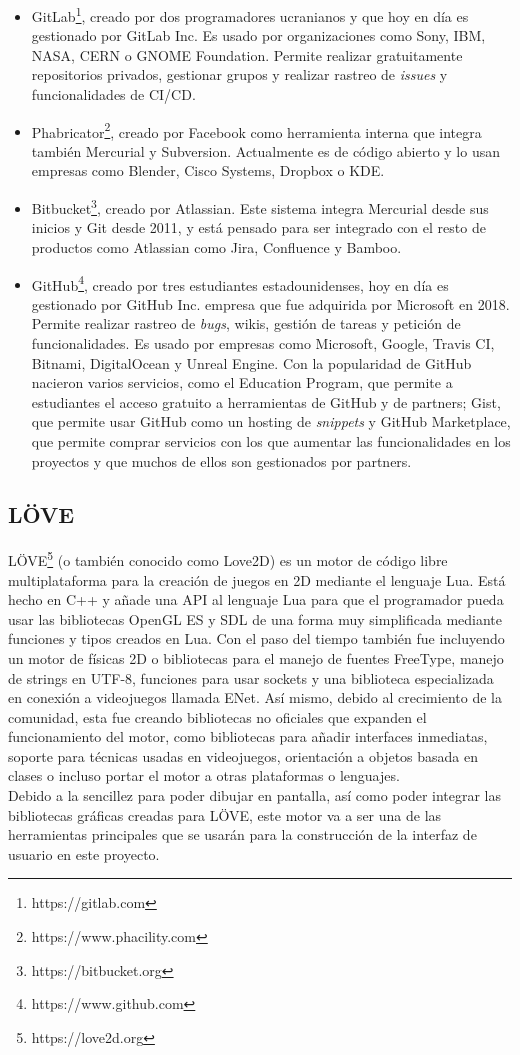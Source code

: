 \begin{itemize}
	\item GitLab\footnote{https://gitlab.com}, creado por dos programadores ucranianos y que hoy en día es gestionado por GitLab Inc. Es usado por organizaciones como Sony, IBM, NASA, CERN o GNOME Foundation. Permite realizar gratuitamente repositorios privados, gestionar grupos y realizar rastreo de \textit{issues} y funcionalidades de CI/CD.
	\item Phabricator\footnote{https://www.phacility.com}, creado por Facebook como herramienta interna que integra también Mercurial y Subversion. Actualmente es de código abierto y lo usan empresas como Blender, Cisco Systems, Dropbox o KDE.
	\item Bitbucket\footnote{https://bitbucket.org}, creado por Atlassian. Este sistema integra Mercurial desde sus inicios y Git desde 2011, y está pensado para ser integrado con el resto de productos como Atlassian como Jira, Confluence y Bamboo.
	\item GitHub\footnote{https://www.github.com}, creado por tres estudiantes estadounidenses, hoy en día es gestionado por GitHub Inc. empresa que fue adquirida por Microsoft en 2018. Permite realizar rastreo de \textit{bugs}, wikis, gestión de tareas y petición de funcionalidades. Es usado por empresas como Microsoft, Google, Travis CI, Bitnami, DigitalOcean y Unreal Engine. Con la popularidad de GitHub nacieron varios servicios, como el Education Program, que permite a estudiantes el acceso gratuito a herramientas de GitHub y de partners; Gist, que permite usar GitHub como un hosting de \textit{snippets} y GitHub Marketplace, que permite comprar servicios con los que aumentar las funcionalidades en los proyectos y que muchos de ellos son gestionados por partners.
\end{itemize}

\subsection{LÖVE}\label{subsec:love2d}

LÖVE\footnote{https://love2d.org} (o también conocido como Love2D) es un motor de código libre multiplataforma para la creación de juegos en 2D mediante el lenguaje Lua. Está hecho en C++ y añade una API al lenguaje Lua para que el programador pueda usar las bibliotecas OpenGL ES y SDL de una forma muy simplificada mediante funciones y tipos creados en Lua. Con el paso del tiempo también fue incluyendo un motor de físicas 2D o bibliotecas para el manejo de fuentes FreeType, manejo de strings en UTF-8, funciones para usar sockets y una biblioteca especializada en conexión a videojuegos llamada ENet. Así mismo, debido al crecimiento de la comunidad, esta fue creando bibliotecas no oficiales que expanden el funcionamiento del motor, como bibliotecas para añadir interfaces inmediatas, soporte para técnicas usadas en videojuegos, orientación a objetos basada en clases o incluso portar el motor a otras plataformas o lenguajes. \\

Debido a la sencillez para poder dibujar en pantalla, así como poder integrar las bibliotecas gráficas creadas para LÖVE, este motor va a ser una de las herramientas principales que se usarán para la construcción de la interfaz de usuario en este proyecto.